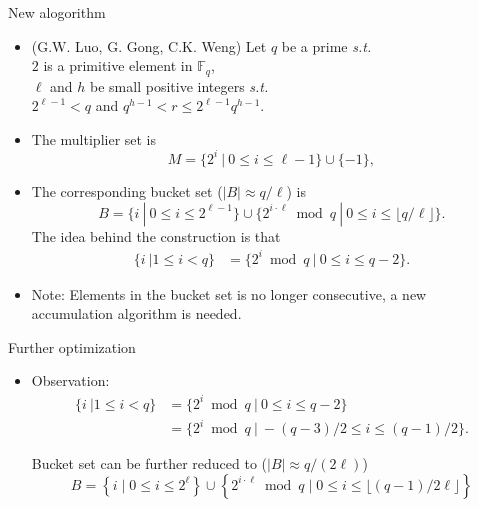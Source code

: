 \documentclass[final]{beamer}
\newlength{\onecolwid}
\begin{document}
\begin{frame}[t]
\begin{columns}[t]
\begin{column}{\onecolwid}
\begin{block}{New alogorithm}
		\begin{itemize}	
			\item (G.W. Luo, G. Gong, C.K. Weng) Let $q$ be a prime \textit{s.t.} \\
			$2$ is a primitive element in $\mathbb{F}_q$,\\
	 $\ell$ and $h$ be small positive integers \textit{s.t.}\\ $2^{\ell-1}<q$ and $q^{h-1} < r \le 2^{\ell-1} q^{h-1}$.
			\item The multiplier set is 
			\begin{equation*}\label{eq_multiplier_m_new}
			M =\{2^i\ |\ 0\le i\le \ell - 1\} \cup \{-1\},
			\end{equation*}
			\item The corresponding bucket set ($|B|\approx q/\ell$) is
			\begin{equation*}\label{eq_bucket_b_new}
			B =\{i\ | \ 0\le i\le 2^{\ell-1} \} \cup
			\{ 2^{i\cdot\ell}\bmod q\ |\ 0\le i \le \lfloor q/\ell \rfloor \}.
			\end{equation*}
			The idea behind the construction is that 
			\begin{equation*}
			\begin{aligned}
			\{i\ |1 \le i < q \} &= \{2^i \bmod q\ | \ 0\le i \le q-2\}.
			\end{aligned}
			\end{equation*}	
			
			\item Note: Elements in the bucket set is no longer consecutive, a new accumulation algorithm is needed.		
		\end{itemize}
\end{block}

\begin{block}{Further optimization}
\small
\begin{itemize}	
		\item	Observation: 										
		\begin{equation*}
				\begin{aligned}
				\{i\ |1 \le i < q \} &= \{2^i \bmod q\ | \ 0\le i \le q-2\}\\
				& = \{2^i \bmod q\ | \ -(q-3)/2\le i \le (q-1)/2\}.
				\end{aligned}
		\end{equation*}	

 Bucket set can be further reduced to ($|B|\approx q/(2\ell)$)
			\begin{equation*}
			B=\left\{i \mid 0 \leq i \leq 2^{\ell}\right\} \cup\left\{2^{i \cdot \ell} \bmod q \mid 0 \leq i \leq\lfloor(q-1) / 2 \ell\rfloor\right\}
			\end{equation*}
			

\end{itemize}
\end{block}
\end{column}
\end{columns}
\end{frame}
\end{document}

